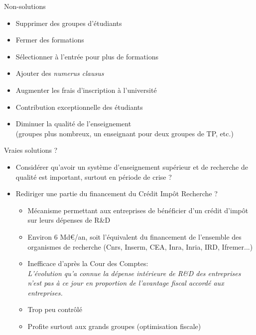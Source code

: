 \documentclass[10pt,final,usepdftitle=false]{beamer}
\begin{document}
\begin{frame}{Non-solutions}
\begin{itemize}
\item Supprimer des groupes d'étudiants
\smallskip
\item Fermer des formations
\smallskip
\item Sélectionner à l'entrée pour plus de formations
\smallskip
\item Ajouter des \textsl{numerus clausus}
\smallskip
\item Augmenter les frais d'inscription à l'université
\smallskip
\item Contribution exceptionnelle des étudiants
\smallskip
\item Diminuer la qualité de l'enseignement\\ {\small (groupes plus nombreux, un enseignant pour deux groupes de TP, etc.)}
\end{itemize}
\end{frame}

\begin{frame}{Vraies solutions ?}
\begin{itemize}
\item Considérer qu'avoir un système d'enseignement supérieur et de recherche de 
qualité est important, surtout en période de crise ?
\pause
\smallskip
\item Rediriger une partie du financement du Crédit Impôt Recherche ?
\begin{itemize}
\item Mécanisme permettant aux entreprises de bénéficier d'un crédit d'impôt sur leurs dépenses de R\&D
\smallskip
\item Environ 6 Md\euro/an, soit l'équivalent du financement de l'ensemble des 
organismes de recherche (Cnrs, Inserm, CEA, Inra, Inria, IRD, Ifremer...)
\smallskip
\item Inefficace d'après la Cour des Comptes:\\
	{\sl \og L’évolution qu’a connue la dépense intérieure de R\&D des entreprises n’est pas à ce jour en proportion de l’avantage fiscal accordé aux entreprises. \fg }
\smallskip
\item Trop peu contrôlé
\smallskip
\item Profite surtout aux grands groupes (optimisation fiscale)
\end{itemize}
\end{itemize}
\end{frame}
\end{document}
